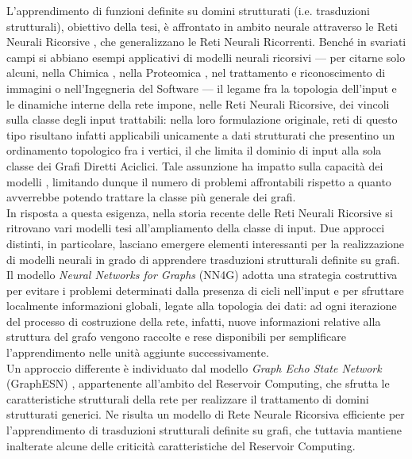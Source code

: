 L'apprendimento di funzioni definite su domini strutturati (i.e. trasduzioni strutturali), obiettivo della tesi, è affrontato in ambito neurale attraverso le Reti Neurali Ricorsive \cite{Frasconi:AGeneralFramework, Sperduti:SupervisedNeuralNetworks}, che generalizzano le Reti Neurali Ricorrenti. 
Benché in svariati campi si abbiano esempi applicativi di modelli neurali ricorsivi --- per citarne solo alcuni, nella Chimica \cite{Bianucci:ApplicationOfCascade,Micheli:AnalysisOfTheInternal,Bertinetto:EvaluationOfHierarchical}, nella Proteomica \cite{Baldi:ThePrincipledDesign}, nel trattamento e riconoscimento di immagini \cite{Frasconi:AGeneralFramework} o nell'Ingegneria del Software \cite{Frasconi:AGeneralFramework} --- il legame fra la topologia dell'input e le dinamiche interne della rete impone, nelle Reti Neurali Ricorsive, dei vincoli sulla classe degli input trattabili: nella loro formulazione originale, reti di questo tipo risultano infatti applicabili unicamente a dati strutturati che presentino un ordinamento topologico fra i vertici, il che limita il dominio di input alla sola classe dei Grafi Diretti Aciclici. Tale assunzione ha impatto sulla capacità dei modelli \cite{Micheli:ContextualProcessing}, limitando dunque il numero di problemi affrontabili rispetto a quanto avverrebbe potendo trattare la classe più generale dei grafi.
\\
In risposta a questa esigenza, nella storia recente delle Reti Neurali Ricorsive si ritrovano vari modelli tesi all'ampliamento della classe di input. Due approcci distinti, in particolare, lasciano emergere elementi interessanti per la realizzazione di modelli neurali in grado di apprendere trasduzioni strutturali definite su grafi.\\
Il modello \emph{Neural Networks for Graphs} (NN4G) \cite{Micheli:NN4G} adotta una strategia costruttiva per evitare i problemi determinati dalla presenza di cicli nell'input e per sfruttare localmente informazioni globali, legate alla topologia dei dati: ad ogni iterazione del processo di costruzione della rete, infatti, nuove informazioni relative alla struttura del grafo vengono raccolte e rese disponibili per semplificare l'apprendimento nelle unità aggiunte successivamente.\\
Un approccio differente è individuato dal modello \emph{Graph Echo State Network} (GraphESN) \cite{Gallicchio:GraphESN}, appartenente all'ambito del Reservoir Computing, che sfrutta le caratteristiche strutturali della rete per realizzare il trattamento di domini strutturati generici. Ne risulta un modello di Rete Neurale Ricorsiva efficiente per l'apprendimento di trasduzioni strutturali definite su grafi, che tuttavia mantiene inalterate alcune delle criticità caratteristiche del Reservoir Computing.

